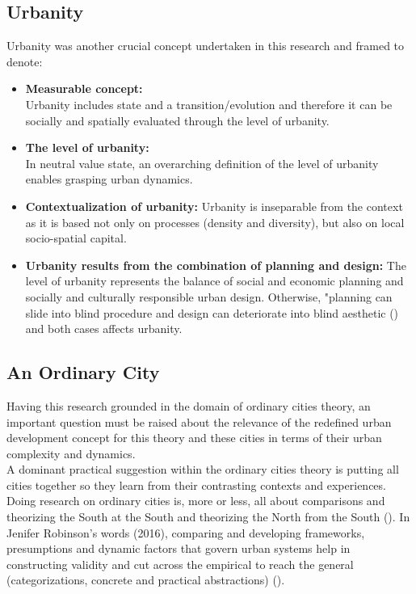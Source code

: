 \documentclass[11pt]{report}
\begin{document}
{{{\subsection{Urbanity}

Urbanity was another crucial concept undertaken in this research and framed to denote:

\begin{itemize}
\item \textbf{Measurable concept:}
\\
Urbanity includes state and a transition/evolution and therefore it can be socially and spatially evaluated through the level of urbanity.

\item \textbf{The level of urbanity:}
\\
In neutral value state, an overarching definition of the level of urbanity enables grasping urban dynamics.

\item \textbf{Contextualization of urbanity:}
Urbanity is inseparable from the context as it is based not only on processes (density and diversity), but also  on local socio-spatial capital.

\item \textbf{Urbanity results from the combination of planning and design:}
The level of urbanity represents the balance of social and economic planning and socially and culturally responsible urban design.
Otherwise, "planning can slide into blind procedure and design can deteriorate into blind aesthetic
(\href{Van}{\citealt{van_assche_co-evolutions_2013}}) and both cases affects urbanity.
\end{itemize}

\subsection{An Ordinary City}

Having this research grounded in the domain of ordinary cities theory, an important question must be raised about the relevance of the redefined urban development concept for this theory and these cities in terms of their urban complexity and dynamics.
\\

A dominant practical suggestion within the ordinary cities theory is putting all cities together so they learn from their contrasting contexts and experiences. Doing research on ordinary cities is, more or less, all about comparisons and theorizing the South at the South   and theorizing the North from the South (\href{Chaplin}{\citealt{chaplin_architecture_2015}}).
In Jenifer Robinson's words (2016), comparing and developing frameworks, presumptions and dynamic factors that govern urban systems help in constructing validity and cut across the empirical to reach the general (categorizations, concrete and practical abstractions) (\href{Robinson}{\citealt{robinson_thinking_2016}}).
\\

}}}
\end{document}
